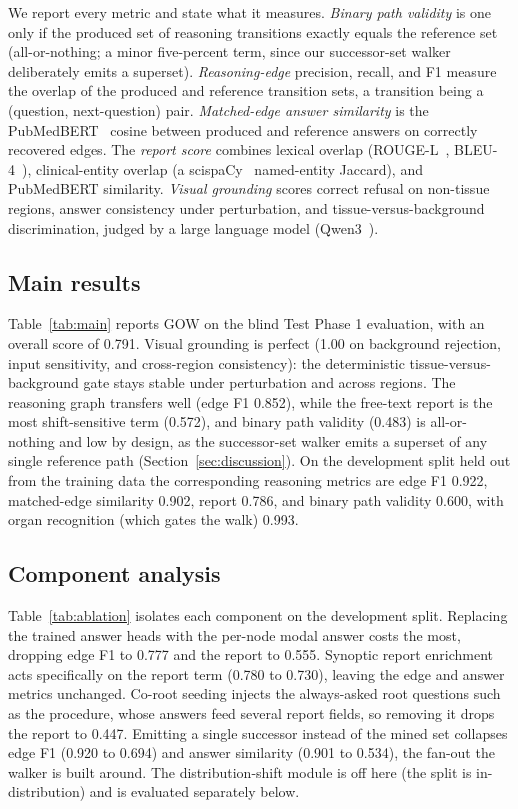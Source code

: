 \documentclass[runningheads]{llncs}
\begin{document}
We report every metric and state what it measures. \emph{Binary path validity} is one only if the produced set
of reasoning transitions exactly equals the reference set (all-or-nothing; a minor five-percent term, since our
successor-set walker deliberately emits a superset). \emph{Reasoning-edge} precision, recall, and F1 measure the
overlap of the produced and reference transition sets, a transition being a (question, next-question) pair.
\emph{Matched-edge answer similarity} is the PubMedBERT~\cite{pubmedbert} cosine between produced and reference
answers on correctly recovered edges. The \emph{report score} combines lexical overlap (ROUGE-L~\cite{rouge},
BLEU-4~\cite{bleu}), clinical-entity overlap (a scispaCy~\cite{scispacy} named-entity Jaccard), and PubMedBERT
similarity. \emph{Visual grounding} scores correct refusal on non-tissue regions, answer consistency under
perturbation, and tissue-versus-background discrimination, judged by a large language model (Qwen3~\cite{qwen3}).

\subsection{Main results}
Table~\ref{tab:main} reports GOW on the blind Test Phase 1 evaluation, with an overall score of 0.791. Visual
grounding is perfect (1.00 on background rejection, input sensitivity, and cross-region consistency): the
deterministic tissue-versus-background gate stays stable under perturbation and across regions. The reasoning
graph transfers well (edge F1 0.852), while the free-text report is the most shift-sensitive term (0.572), and
binary path validity (0.483) is all-or-nothing and low by design, as the successor-set walker emits a superset of
any single reference path (Section~\ref{sec:discussion}). On the development split held out from the training
data the corresponding reasoning metrics are edge F1 0.922, matched-edge similarity 0.902, report 0.786, and
binary path validity 0.600, with organ recognition (which gates the walk) 0.993.



\subsection{Component analysis}
Table~\ref{tab:ablation} isolates each component on the development split. Replacing the trained answer heads with the per-node modal
answer costs the most, dropping edge F1 to 0.777 and the report to 0.555. Synoptic report enrichment acts specifically on the report term
(0.780 to 0.730), leaving the edge and answer metrics unchanged. Co-root seeding injects the always-asked root
questions such as the procedure, whose answers feed several report fields, so removing it drops the report to
0.447. Emitting a single successor instead of the mined set collapses edge F1 (0.920 to 0.694) and answer
similarity (0.901 to 0.534), the fan-out the walker is built around. The distribution-shift module is off here
(the split is in-distribution) and is evaluated separately below.
\end{document}
